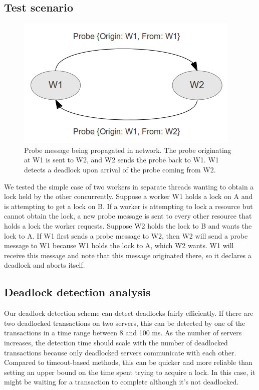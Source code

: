 \documentclass[a4paper, 10pt, notitlepage]{report}
\begin{document}
\subsection*{Test scenario}
\begin{figure}[h!]

  \centering
    \includegraphics[scale=0.9]{deadlock-message.png}
  \caption{Probe message being propagated in network. The probe originating at W1 is sent to W2, and W2 sends the probe back to W1. W1 detects a deadlock upon arrival of the probe coming from W2.}
\end{figure}
We tested the simple case of two workers in separate threads wanting to obtain a lock held by the other concurrently. Suppose a worker W1 holds a lock on A and is attempting to get a lock on B. If a worker is attempting to lock a resource but cannot obtain the lock, a new probe message is sent to every other resource that holds a lock the worker requests. Suppose W2 holds the lock to B and wants the lock to A. If W1 first sends a probe message to W2, then W2 will send a probe message to W1 because W1 holds the lock to A, which W2 wants. W1 will receive this message and note that this message originated there, so it declares a deadlock and aborts itself.

\subsection*{Deadlock detection analysis}
Our deadlock detection scheme can detect deadlocks fairly efficiently. If there are two deadlocked transactions on two servers, this can be detected by one of the transactions in a time range between 8 and 100 ms. As the number of servers increases, the detection time should scale with the number of deadlocked transactions because only deadlocked servers communicate with each other. Compared to timeout-based methods, this can be quicker and more reliable than setting an upper bound on the time spent trying to acquire a lock. In this case, it might be waiting for a transaction to complete although it's not deadlocked.
\end{document}
